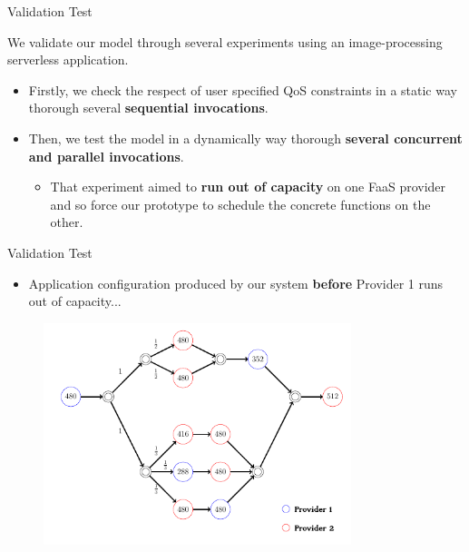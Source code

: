 \documentclass[13.5pt]{beamer}
\newcommand{\B}[1]{\textcolor{TorVergataColor}{\textbf{#1}}}
\begin{document}
\begin{frame}{Validation Test}
	
\begin{block}{}
	\centering
	We validate our model through several experiments using an image-processing serverless application.
\end{block}
	\vspace{\baselineskip}
\begin{itemize}
	\item Firstly, we check the respect of user specified QoS constraints in a static way thorough several \B{sequential invocations}.
	\vspace{\baselineskip}
	\item Then, we test the model in a dynamically way thorough \B{several concurrent and parallel invocations}. 
	\begin{itemize}
	\item That experiment aimed to \B{run out of capacity} on one FaaS provider and so force our prototype to schedule the concrete functions on the other.
	\end{itemize}
\end{itemize}

\end{frame}


\begin{frame}{Validation Test}
	
	\begin{itemize}
		\item Application configuration produced by our system \B{before} Provider 1 runs out of capacity...
	\end{itemize}
	
	\begin{figure}[h]
		\centering
		\includegraphics[width=0.8\textwidth,height=0.55\columnwidth]{../Images/EXP1ForSlide.png}
	\end{figure}
	
	
\end{frame}
\end{document}
